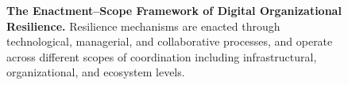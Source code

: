 \begin{figure}[!ht]

\caption{\textbf{The Enactment–Scope Framework of Digital Organizational Resilience.}
Resilience mechanisms are enacted through technological, managerial, and collaborative processes, and operate across different scopes of coordination including infrastructural, organizational, and ecosystem levels.}
\label{fig:enactment_scope}
\end{figure}